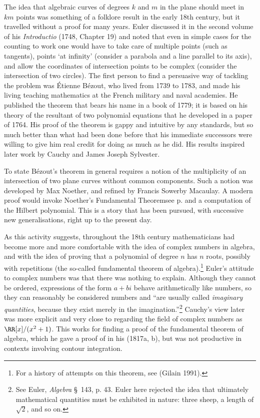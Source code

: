 The idea that algebraic curves of degrees $k$ and $m$ in the plane should meet in $km$ points was something of a folklore result in the early 18th century, but it travelled without a proof for many years. Euler discussed it in the second volume of his  \emph{Introductio} (1748, Chapter 19) and noted that even in simple cases  for the counting to work one would have to take care of multiple points (such as tangents),  points `at infinity' (consider a parabola and a line parallel to its axis), and allow the  coordinates of intersection points to be complex (consider the intersection of two circles). The first person to find a persuasive way of tackling the problem was \'Etienne B\'ezout, who lived from 1739 to 1783, and made his living teaching mathematics at the French military and naval academies. He published the theorem that bears his name in a book of 1779; it is based on his theory of the resultant of two polynomial equations that he developed in a paper of 1764. His proof of the theorem is gappy and intuitive by any standards, but so much better than what had been done before that his immediate successors were willing to give him real credit for doing as much as he did. His results inspired later work by Cauchy and James Joseph Sylvester.

To state  B\'ezout's theorem in general requires a notion of the multiplicity of an intersection of two plane curves without common components. Such a notion was developed by Max Noether, and refined by Francis Sowerby Macaulay. A modern proof would invoke Noether's Fundamental Theorem\emdash see p. \pageref{Noether'sFT}\emdash and a computation of the Hilbert polynomial. This is a story that  has been pursued, with successive new generalisations, right up to the present day. 


As this activity suggests, throughout the 18th century mathematicians had become more and more comfortable with the idea of complex numbers in algebra, and with the idea of proving that a polynomial of degree $n$ has $n$ roots, possibly with repetitions (the so-called fundamental theorem of algebra).\footnote{For a history of attempts on this theorem, see (Gilain 1991).} Euler's attitude to complex numbers was that there was nothing to explain. Although they cannot be ordered, expressions of the form $a+bi$  behave arithmetically like numbers, so they can reasonably be considered numbers  and ``are usually called \emph{imaginary quantities}, because they exist merely in the imagination.''\footnote{See Euler, \emph{Algebra} \S\, 143, p. 43. Euler here rejected the idea that ultimately mathematical quantities must be exhibited in nature: three sheep, a length of $\sqrt{2}$, and so on.} Cauchy's view later was more explicit and very close to regarding  the field of complex numbers as $\RR [x]/(x^2 + 1)$. This works for finding a proof of the fundamental theorem of algebra, which he gave a proof of in his (1817a, b), but was not productive in contexts involving contour integration. 

